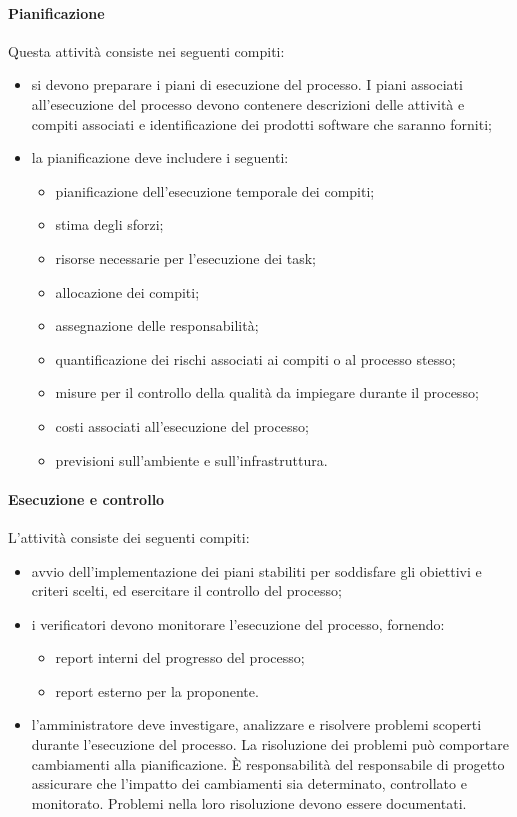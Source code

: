 		\paragraph{Pianificazione}
		Questa attività consiste nei seguenti compiti:
		\begin{itemize}
			\item si devono preparare i piani di esecuzione del processo. I piani associati all'esecuzione del processo devono contenere descrizioni delle attività e compiti associati e  identificazione dei prodotti software che saranno forniti;
			\item la pianificazione deve includere i seguenti:
			\begin{itemize}
				\item pianificazione dell'esecuzione temporale dei compiti;
				\item stima degli sforzi;
				\item risorse necessarie per l'esecuzione dei task;
				\item allocazione dei compiti;
				\item assegnazione delle responsabilità;
				\item quantificazione dei rischi associati ai compiti o al processo stesso;
				\item misure per il controllo della qualità da impiegare durante il processo;
				\item costi associati all'esecuzione del processo;
				\item previsioni sull'ambiente e sull'infrastruttura. 
			\end{itemize}
		\end{itemize}
		\paragraph{Esecuzione e controllo}
		L'attività consiste dei seguenti compiti:
		\begin{itemize}
			\item avvio dell'implementazione dei piani stabiliti per soddisfare gli obiettivi e criteri scelti, ed esercitare il controllo del processo;
			\item i verificatori devono monitorare l'esecuzione del processo, fornendo:
			\begin{itemize}
				\item report interni del progresso del processo;
				\item report esterno per la proponente.
			\end{itemize}
			\item l'amministratore deve investigare, analizzare e risolvere problemi scoperti durante l'esecuzione del processo. La risoluzione dei problemi può comportare cambiamenti alla pianificazione. È responsabilità del responsabile di progetto assicurare che l'impatto dei cambiamenti sia determinato, controllato e monitorato. Problemi nella loro risoluzione devono essere documentati.
		\end{itemize}

